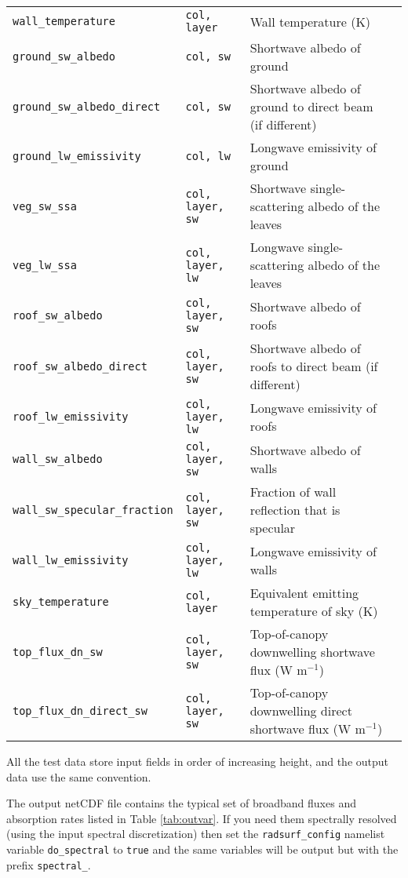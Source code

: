 \documentclass[a4,oneside]{article}
\def\codesize{\small}
\def\codetabsize{\footnotesize}
\def\code#1{{\codesize\texttt{#1}}}
\def\codetab#1{{\codetabsize\texttt{#1}}}
\begin{document}
\begin{center}
\begin{longtable}{llLp{8cm}}
\codetab{wall\_temperature} & \codetab{col, layer} & Wall temperature (K) \\
%
\codetab{ground\_sw\_albedo} & \codetab{col, sw} & Shortwave albedo of ground \\
\codetab{ground\_sw\_albedo\_direct} & \codetab{col, sw} & Shortwave albedo of ground to direct beam (if different)\\
\codetab{ground\_lw\_emissivity} & \codetab{col, lw} & Longwave emissivity of ground \\
%
\codetab{veg\_sw\_ssa} & \codetab{col, layer, sw} & Shortwave single-scattering albedo of the leaves \\
\codetab{veg\_lw\_ssa} & \codetab{col, layer, lw} & Longwave single-scattering albedo of the leaves \\
%
\codetab{roof\_sw\_albedo} & \codetab{col, layer, sw} & Shortwave albedo of roofs \\
\codetab{roof\_sw\_albedo\_direct} & \codetab{col, layer, sw} & Shortwave albedo of roofs to direct beam (if different)\\
\codetab{roof\_lw\_emissivity} & \codetab{col, layer, lw} & Longwave emissivity of roofs \\
%
\codetab{wall\_sw\_albedo} & \codetab{col, layer, sw} & Shortwave albedo of walls \\
\codetab{wall\_sw\_specular\_fraction} & \codetab{col, layer, sw} & Fraction of wall reflection that is specular \\
\codetab{wall\_lw\_emissivity} & \codetab{col, layer, lw} & Longwave emissivity of walls \\
%
\codetab{sky\_temperature} & \codetab{col, layer} & Equivalent emitting temperature of sky (K) \\
\codetab{top\_flux\_dn\_sw} & \codetab{col, layer, sw} & Top-of-canopy downwelling shortwave flux (W m$^{-1}$) \\
\codetab{top\_flux\_dn\_direct\_sw} & \codetab{col, layer, sw} & Top-of-canopy downwelling direct shortwave flux (W m$^{-1}$) \\
\hline
\end{longtable}
\end{center}

All the test data store input fields in order of increasing height,
and the output data use the same convention. 

The output netCDF file contains the typical set of broadband fluxes
and absorption rates listed in Table \ref{tab:outvar}. If you need
them spectrally resolved (using the input spectral discretization)
then set the \code{radsurf\_config} namelist variable
\code{do\_spectral} to \code{true} and the same variables will be
output but with the prefix \code{spectral\_}.
\end{document}

